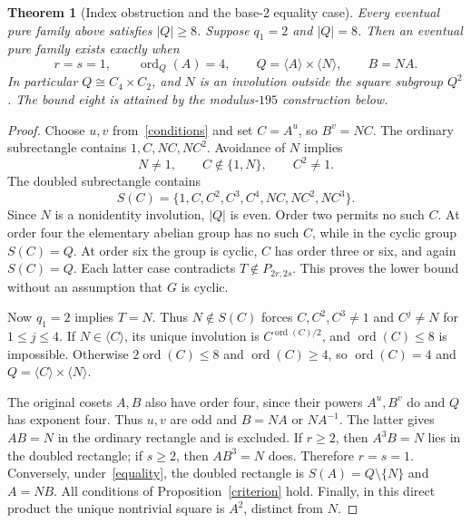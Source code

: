 \documentclass[11pt,a4paper]{article}
\newtheorem{theorem}{Theorem}
\theoremstyle{definition}\newtheorem{definition}[theorem]{Definition}
\newcommand{\ord}{\operatorname{ord}}
\begin{document}
\begin{theorem}[Index obstruction and the base-2 equality case]\label{index}
Every eventual pure family above satisfies $|Q|\ge8$. Suppose $q_1=2$ and $|Q|=8$. Then an eventual pure family exists exactly when
\begin{equation}\label{equality}
r=s=1,\qquad \ord_Q(A)=4,\qquad
Q=\langle A\rangle\times\langle N\rangle,\qquad B=NA.
\end{equation}
In particular $Q\cong C_4\times C_2$, and $N$ is an involution outside the square subgroup $Q^2$. The bound eight is attained by the modulus-$195$ construction below.
\end{theorem}
\begin{proof}
Choose $u,v$ from~\eqref{conditions} and set $C=A^u$, so $B^v=NC$. The ordinary subrectangle contains $1,C,NC,NC^2$. Avoidance of $N$ implies
\[
N\ne1,\qquad C\notin\{1,N\},\qquad C^2\ne1.
\]
The doubled subrectangle contains
\begin{equation}\label{footprint}
S(C)=\{1,C,C^2,C^3,C^4,NC,NC^2,NC^3\}.
\end{equation}
Since $N$ is a nonidentity involution, $|Q|$ is even. Order two permits no such $C$. At order four the elementary abelian group has no such $C$, while in the cyclic group $S(C)=Q$. At order six the group is cyclic, $C$ has order three or six, and again $S(C)=Q$. Each latter case contradicts $T\notin P_{2r,2s}$. This proves the lower bound without an assumption that $G$ is cyclic.

Now $q_1=2$ implies $T=N$. Thus $N\notin S(C)$ forces $C,C^2,C^3\ne1$ and $C^j\ne N$ for $1\le j\le4$. If $N\in\langle C\rangle$, its unique involution is $C^{\ord(C)/2}$, and $\ord(C)\le8$ is impossible. Otherwise $2\ord(C)\le8$ and $\ord(C)\ge4$, so $\ord(C)=4$ and $Q=\langle C\rangle\times\langle N\rangle$.

The original cosets $A,B$ also have order four, since their powers $A^u,B^v$ do and $Q$ has exponent four. Thus $u,v$ are odd and $B=NA$ or $NA^{-1}$. The latter gives $AB=N$ in the ordinary rectangle and is excluded. If $r\ge2$, then $A^3B=N$ lies in the doubled rectangle; if $s\ge2$, then $AB^3=N$ does. Therefore $r=s=1$. Conversely, under~\eqref{equality}, the doubled rectangle is $S(A)=Q\setminus\{N\}$ and $A=NB$. All conditions of Proposition~\ref{criterion} hold. Finally, in this direct product the unique nontrivial square is $A^2$, distinct from $N$.
\end{proof}
\end{document}

